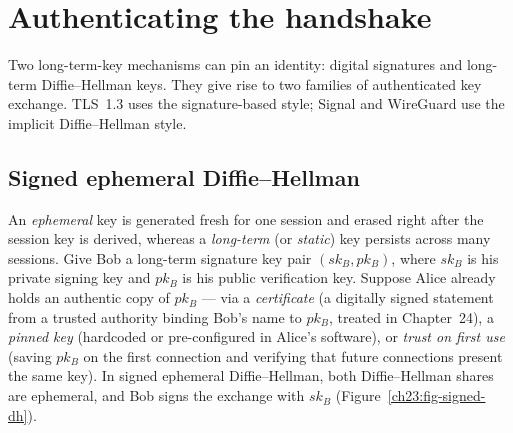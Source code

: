 \section{Authenticating the handshake}

Two long-term-key mechanisms can pin an identity: digital signatures and
long-term Diffie--Hellman keys. They give rise to two families of authenticated
key exchange. TLS~1.3 uses the signature-based style; Signal and WireGuard use
the implicit Diffie--Hellman style.

\subsection{Signed ephemeral Diffie--Hellman}

An \emph{ephemeral} key is generated fresh for one session and erased right
after the session key is derived, whereas a \emph{long-term} (or \emph{static})
key persists across many sessions. Give Bob a long-term signature key pair
$(sk_B, pk_B)$, where $sk_B$ is his private signing key and $pk_B$ is his public
verification key. Suppose Alice already holds an authentic copy of $pk_B$ ---
via a \emph{certificate} (a digitally signed statement from a trusted authority
binding Bob's name to $pk_B$, treated in Chapter~24), a \emph{pinned key}
(hardcoded or pre-configured in Alice's software), or \emph{trust on first use}
(saving $pk_B$ on the first connection and verifying that future connections
present the same key). In signed ephemeral Diffie--Hellman, both Diffie--Hellman
shares are ephemeral, and Bob signs the exchange with $sk_B$
(Figure~\ref{ch23:fig-signed-dh}).


